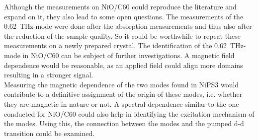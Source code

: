 Although the measurements on NiO/C60 could reproduce the literature and expand on it, they also lead to some open questions.
The measurements of the \qty{0.62}{THz}-mode were done after the absorption measurements and thus also after the reduction of the sample quality.
So it could be worthwhile to repeat these measurements on a newly prepared crystal.
The identification of the \qty{0.62}{THz}-mode in NiO/C60 can be subject of further investigations.
A magnetic field dependence would be reasonable, as an applied field could align more domains resulting in a stronger signal. \\
Measuring the magnetic dependence of the two modes found in NiPS3 would contribute to a definitive assignment of the origin of these modes, i.e. whether they are magnetic in nature or not.
A spectral dependence similar to the one conducted for NiO/C60 could also help in identifying the excitation mechanism of the modes.
Using this, the connection between the modes and the pumped d-d transition could be examined.




